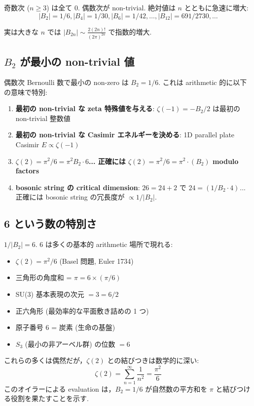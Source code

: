 \documentclass[11pt,a4paper]{article}
\begin{document}
奇数次 ($n \geq 3$) は全て 0. 偶数次が non-trivial. 絶対値は
$n$ とともに急速に増大:
$$|B_2| = 1/6, |B_4| = 1/30, |B_6| = 1/42, \ldots, |B_{12}| = 691/2730, \ldots$$

実は大きな $n$ では $|B_{2n}| \sim \frac{2(2n)!}{(2\pi)^{2n}}$ で指数的増大.

\subsection{$B_2$ が最小の non-trivial 値}

偶数次 Bernoulli 数で最小の non-zero は $B_2 = 1/6$. これは
arithmetic 的に以下の意味で特別:

\begin{enumerate}
\item \textbf{最初の non-trivial な zeta 特殊値を与える}:
$\zeta(-1) = -B_2/2$ は最初の non-trivial 整数値
\item \textbf{最初の non-trivial な Casimir エネルギーを決める}:
1D parallel plate Casimir $E \propto \zeta(-1)$
\item \textbf{$\zeta(2) = \pi^2/6 = \pi^2 B_2 \cdot 6$... 正確には
$\zeta(2) = \pi^2/6 = \pi^2 \cdot (B_2)$ modulo factors}
\item \textbf{bosonic string の critical dimension}: $26 = 24 + 2$ で
$24 = (1/B_2 \cdot 4)^{}$... 正確には bosonic string の冗長度が
$\propto 1/|B_2|$.
\end{enumerate}

\subsection{6 という数の特別さ}

$1/|B_2| = 6$. 6 は多くの基本的 arithmetic 場所で現れる:

\begin{itemize}
\item $\zeta(2) = \pi^2/6$ (Basel 問題, Euler 1734)
\item 三角形の角度和 = $\pi = 6 \times (\pi/6)$
\item SU(3) 基本表現の次元 $= 3 = 6/2$
\item 正六角形 (最効率的な平面敷き詰めの 1 つ)
\item 原子番号 $6$ = 炭素 (生命の基盤)
\item $S_3$ (最小の非アーベル群) の位数 $= 6$
\end{itemize}

これらの多くは偶然だが，$\zeta(2)$ との結びつきは数学的に深い:
\begin{equation}
\zeta(2) = \sum_{n=1}^\infty \frac{1}{n^2} = \frac{\pi^2}{6}
\end{equation}
このオイラーによる evaluation は，$B_2 = 1/6$ が自然数の平方和を
$\pi$ と結びつける役割を果たすことを示す.
\end{document}
